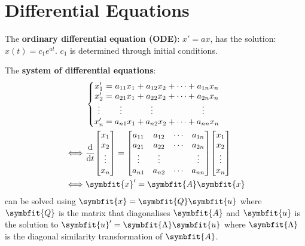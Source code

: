 \documentclass{article}
\begin{document}
\section*{Differential Equations}
The \textbf{ordinary differential equation (ODE)}: \(x' = a x\),
has the solution: \(x(t) = c_1 e^{a t}\). \(c_1\) is determined through
initial conditions.
\begin{multicols*}{2}
    The \textbf{system of differential equations}:
    \begin{align*}
               & \left\{
        \setlength\arraycolsep{0pt}
        \begin{array}{ c >{{}}c<{{}} c >{{}}c<{{}} c >{{}}c<{{}} c >{{}}c<{{}} c  }
            x'_1               & = & a_{11}x_1                         & + & a_{12}x_2                         & + & \cdots & + & a_{1n}x_n                         \\
            x'_2               & = & a_{21}x_1                         & + & a_{22}x_2                         & + & \cdots & + & a_{2n}x_n                         \\
            \vdotswithin{x'_3} &   & \vdotswithin{a_{31}}\phantom{x_1} &   & \vdotswithin{a_{32}}\phantom{x_2} &   &        &   & \vdotswithin{a_{3n}}\phantom{x_n} \\
            x'_n               & = & a_{n1}x_1                         & + & a_{n2}x_2                         & + & \cdots & + & a_{nn}x_n
        \end{array}
        \right.                                                           \\
        \iff
               & \dv{t}\mqty[x_1                                          \\ x_2 \\ \vdots \\ x_n] = \mqty[
        a_{11} & a_{12}                                 & \cdots & a_{1n} \\
        a_{21} & a_{22}                                 & \cdots & a_{2n} \\
        \vdots & \vdots                                 &        & \vdots \\
        a_{n1} & a_{n2}                                 & \cdots & a_{nn}
        ] \mqty[x_1                                                       \\ x_2 \\ \vdots \\ x_n] \\
        \iff   & \symbfit{x}' = \symbfit{A} \symbfit{x}
    \end{align*}
    can be solved using \(\symbfit{x}=\symbfit{Q}\symbfit{u}\) where
    \(\symbfit{Q}\) is the matrix that diagonalises \(\symbfit{A}\) and
    \(\symbfit{u}\) is the solution to \(\symbfit{u}' = \symbfit{\Lambda} \symbfit{u}\) where
    \(\symbfit{\Lambda}\) is the diagonal similarity transformation of \(\symbfit{A}\).


\end{multicols*}
\end{document}
